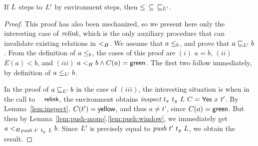 

\begin{lemma}\label{lem:jleq-stable}
If $L$ steps to $L'$ by environment steps, then
$\leq_{\,}{\subseteq}\,\mathrel{\sqsubseteq_{L'}}$.
\end{lemma}

\begin{proof}
This proof has also been mechanized, so we present here only the
interesting case of $\textit{relink}$, which is the only auxiliary
procedure that can invalidate existing relations in $\mathrel{<_H}$. We assume
that $a \leq_{b}$, and prove that $a \mathrel{\sqsubseteq_{L'}} b$. From the definition of
$a \leq_{b}$, the cases of this proof are $(i)$ $a = b$, $(ii)$ $E(a) <
b$, and $(iii)$ $a \mathrel{<_H} b \wedge C(a)=\mathsf{green}$. The first two
follow immediately, by definition of $a \mathrel{\leq_{L'}} b$.

In the proof of $a \mathrel{\sqsubseteq_{L'}} b$ in the case of $(iii)$, the interesting
situation is when in the call to $\act{relink}$, the environment
obtains $\textit{inspect}\ t_x\ t_y\ L\ C =
\mathsf{Yes}\ x\ t'$. By Lemma~\ref{lem:inspect}, $C(t') =
\mathsf{yellow}$, and thus $a \neq t'$, since
$C(a)=\mathsf{green}$. But then by
Lemma~\ref{lem:push-mono}.\ref{lem:push:window}, we immediately get $a
\mathrel{<_H}_{\textit{push}\ t'\ t_y\ L} b$.  Since $L'$ is
precisely equal to $\textit{push}\ t'\ t_y\ L$, we obtain the
result.
\end{proof}

%

